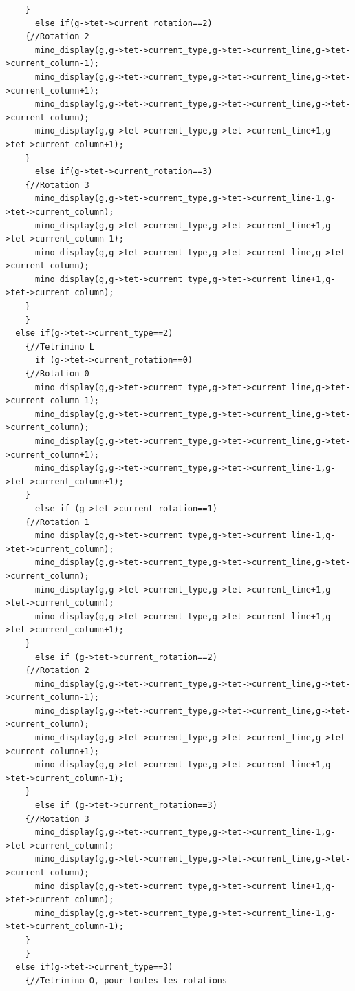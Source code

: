 \documentclass[a4paper,10p]{report}
\begin{document}
\begin{lstlisting}
	}
      else if(g->tet->current_rotation==2)
	{//Rotation 2
	  mino_display(g,g->tet->current_type,g->tet->current_line,g->tet->current_column-1);
	  mino_display(g,g->tet->current_type,g->tet->current_line,g->tet->current_column+1);
	  mino_display(g,g->tet->current_type,g->tet->current_line,g->tet->current_column);
	  mino_display(g,g->tet->current_type,g->tet->current_line+1,g->tet->current_column+1);
	}
      else if(g->tet->current_rotation==3)
	{//Rotation 3
	  mino_display(g,g->tet->current_type,g->tet->current_line-1,g->tet->current_column);
	  mino_display(g,g->tet->current_type,g->tet->current_line+1,g->tet->current_column-1);
	  mino_display(g,g->tet->current_type,g->tet->current_line,g->tet->current_column);
	  mino_display(g,g->tet->current_type,g->tet->current_line+1,g->tet->current_column);
	}
    }
  else if(g->tet->current_type==2)
    {//Tetrimino L
      if (g->tet->current_rotation==0)
	{//Rotation 0
	  mino_display(g,g->tet->current_type,g->tet->current_line,g->tet->current_column-1);
	  mino_display(g,g->tet->current_type,g->tet->current_line,g->tet->current_column);
	  mino_display(g,g->tet->current_type,g->tet->current_line,g->tet->current_column+1);
	  mino_display(g,g->tet->current_type,g->tet->current_line-1,g->tet->current_column+1);
	}
      else if (g->tet->current_rotation==1)
	{//Rotation 1
	  mino_display(g,g->tet->current_type,g->tet->current_line-1,g->tet->current_column);
	  mino_display(g,g->tet->current_type,g->tet->current_line,g->tet->current_column);
	  mino_display(g,g->tet->current_type,g->tet->current_line+1,g->tet->current_column);
	  mino_display(g,g->tet->current_type,g->tet->current_line+1,g->tet->current_column+1);
	}
      else if (g->tet->current_rotation==2)
	{//Rotation 2
	  mino_display(g,g->tet->current_type,g->tet->current_line,g->tet->current_column-1);
	  mino_display(g,g->tet->current_type,g->tet->current_line,g->tet->current_column);
	  mino_display(g,g->tet->current_type,g->tet->current_line,g->tet->current_column+1);
	  mino_display(g,g->tet->current_type,g->tet->current_line+1,g->tet->current_column-1);
	}
      else if (g->tet->current_rotation==3)
	{//Rotation 3
	  mino_display(g,g->tet->current_type,g->tet->current_line-1,g->tet->current_column);
	  mino_display(g,g->tet->current_type,g->tet->current_line,g->tet->current_column);
	  mino_display(g,g->tet->current_type,g->tet->current_line+1,g->tet->current_column);
	  mino_display(g,g->tet->current_type,g->tet->current_line-1,g->tet->current_column-1);
	}
    }
  else if(g->tet->current_type==3)
    {//Tetrimino O, pour toutes les rotations

\end{lstlisting}
\end{document}
